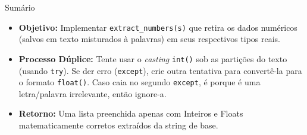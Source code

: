 \documentclass[11pt,a4paper]{article}
\begin{document}
\begin{exercicio}{Sumário}
\begin{itemize}
    \item \textbf{Objetivo:} Implementar \texttt{extract\_numbers(s)} que retira os dados numéricos (salvos em texto misturados à palavras) em seus respectivos tipos reais. 
    \item \textbf{Processo Dúplice:} Tente usar o \textit{casting} \texttt{int()} sob as partições do texto (usando \texttt{try}). Se der erro (\texttt{except}), crie outra tentativa para convertê-la para o formato \texttt{float()}. Caso caia no segundo \texttt{except}, é porque é uma letra/palavra irrelevante, então ignore-a.
    \item \textbf{Retorno:} Uma lista preenchida apenas com Inteiros e Floats matematicamente corretos extraídos da string de base.
\end{itemize}
\end{exercicio}
\end{document}
